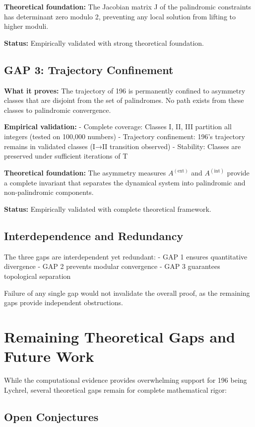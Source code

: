 \documentclass[12pt,a4paper]{article}
\begin{document}
\textbf{Theoretical foundation:} The Jacobian matrix J of the palindromic constraints has determinant zero modulo 2, preventing any local solution from lifting to higher moduli.

\textbf{Status:} \checkmark Empirically validated with strong theoretical foundation.

\subsection{GAP 3: Trajectory Confinement}
\textbf{What it proves:} The trajectory of 196 is permanently confined to asymmetry classes that are disjoint from the set of palindromes. No path exists from these classes to palindromic convergence.

\textbf{Empirical validation:}
- Complete coverage: Classes I, II, III partition all integers (tested on 100,000 numbers)
- Trajectory confinement: 196's trajectory remains in validated classes (I→II transition observed)
- Stability: Classes are preserved under sufficient iterations of T

\textbf{Theoretical foundation:} The asymmetry measures $A^{(\mathrm{ext})}$ and $A^{(\mathrm{int})}$ provide a complete invariant that separates the dynamical system into palindromic and non-palindromic components.

\textbf{Status:} \checkmark Empirically validated with complete theoretical framework.

\subsection{Interdependence and Redundancy}
The three gaps are interdependent yet redundant:
- GAP 1 ensures quantitative divergence
- GAP 2 prevents modular convergence
- GAP 3 guarantees topological separation

Failure of any single gap would not invalidate the overall proof, as the remaining gaps provide independent obstructions.

\section{Remaining Theoretical Gaps and Future Work}

While the computational evidence provides overwhelming support for 196 being Lychrel, several theoretical gaps remain for complete mathematical rigor:

\subsection{Open Conjectures}
\end{document}
